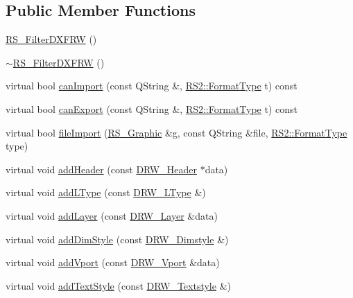 \subsection*{Public Member Functions}
\begin{DoxyCompactItemize}
\item 
\hyperlink{classRS__FilterDXFRW_a08cc6076c03204e701f14b761b478b2e}{R\-S\-\_\-\-Filter\-D\-X\-F\-R\-W} ()
\item 
\hyperlink{classRS__FilterDXFRW_a46a6970d773828b2d127ead737eb56fb}{$\sim$\-R\-S\-\_\-\-Filter\-D\-X\-F\-R\-W} ()
\item 
virtual bool \hyperlink{classRS__FilterDXFRW_a85d528cdd4b31945e688bf5429f8e05d}{can\-Import} (const Q\-String \&, \hyperlink{classRS2_a077a6c94c9a0ab9962c4d4a612c7189b}{R\-S2\-::\-Format\-Type} t) const 
\item 
virtual bool \hyperlink{classRS__FilterDXFRW_a59c829eab8ba4a12c937b10dc556e96e}{can\-Export} (const Q\-String \&, \hyperlink{classRS2_a077a6c94c9a0ab9962c4d4a612c7189b}{R\-S2\-::\-Format\-Type} t) const 
\item 
virtual bool \hyperlink{classRS__FilterDXFRW_a054c1910f411e9d9bfcd3e0c5289391e}{file\-Import} (\hyperlink{classRS__Graphic}{R\-S\-\_\-\-Graphic} \&g, const Q\-String \&file, \hyperlink{classRS2_a077a6c94c9a0ab9962c4d4a612c7189b}{R\-S2\-::\-Format\-Type} type)
\item 
virtual void \hyperlink{classRS__FilterDXFRW_acd70f03c3b63221893ed1a9c9f805650}{add\-Header} (const \hyperlink{classDRW__Header}{D\-R\-W\-\_\-\-Header} $\ast$data)
\item 
virtual void \hyperlink{classRS__FilterDXFRW_a722df9b9b3bf4d8f7e38e3ac1328a74d}{add\-L\-Type} (const \hyperlink{classDRW__LType}{D\-R\-W\-\_\-\-L\-Type} \&)
\item 
virtual void \hyperlink{classRS__FilterDXFRW_ad275f9aa0aa43a38931fe942c0eac492}{add\-Layer} (const \hyperlink{classDRW__Layer}{D\-R\-W\-\_\-\-Layer} \&data)
\item 
virtual void \hyperlink{classRS__FilterDXFRW_a0367a709c29c7349e4e49cc91750cc56}{add\-Dim\-Style} (const \hyperlink{classDRW__Dimstyle}{D\-R\-W\-\_\-\-Dimstyle} \&)
\item 
virtual void \hyperlink{classRS__FilterDXFRW_a53ed18a5e44b4691a229051f41a6abf2}{add\-Vport} (const \hyperlink{classDRW__Vport}{D\-R\-W\-\_\-\-Vport} \&data)
\item 
virtual void \hyperlink{classRS__FilterDXFRW_a1f7ed4acf00c005f57620fea3b23f718}{add\-Text\-Style} (const \hyperlink{classDRW__Textstyle}{D\-R\-W\-\_\-\-Textstyle} \&)

\end{DoxyCompactItemize}
